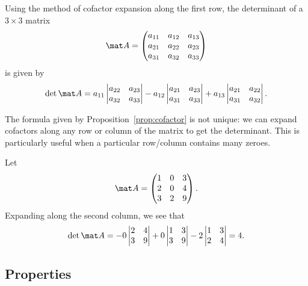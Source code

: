 \begin{example}
    Using the method of cofactor expansion along the first row, the determinant of a $3 \times 3$ matrix \[\mat A = \begin{pmatrix}a_{11} & a_{12} & a_{13} \\ a_{21} & a_{22} & a_{23} \\ a_{31} & a_{32} & a_{33}\end{pmatrix}\] is given by \[\det{\mat A} = a_{11} \begin{vmatrix}a_{22} & a_{23} \\ a_{32} & a_{33}\end{vmatrix} - a_{12} \begin{vmatrix}a_{21} & a_{23} \\ a_{31} & a_{33}\end{vmatrix} + a_{13} \begin{vmatrix}a_{21} & a_{22} \\ a_{31} & a_{32}\end{vmatrix}.\]
\end{example}

The formula given by Proposition~\ref{prop:cofactor} is not unique: we can expand cofactors along any row or column of the matrix to get the determinant. This is particularly useful when a particular row/column contains many zeroes.

\begin{example}
    Let \[\mat A = \begin{pmatrix}1 & 0 & 3 \\ 2 & 0 & 4 \\ 3 & 2 & 9\end{pmatrix}.\] Expanding along the second column, we see that \[\det{\mat A} = -0 \begin{vmatrix}2 & 4 \\ 3 & 9\end{vmatrix} + 0 \begin{vmatrix}1 & 3 \\ 3 & 9\end{vmatrix} - 2 \begin{vmatrix}1 & 3 \\ 2 & 4\end{vmatrix} = 4.\]
\end{example}

\subsection{Properties}

